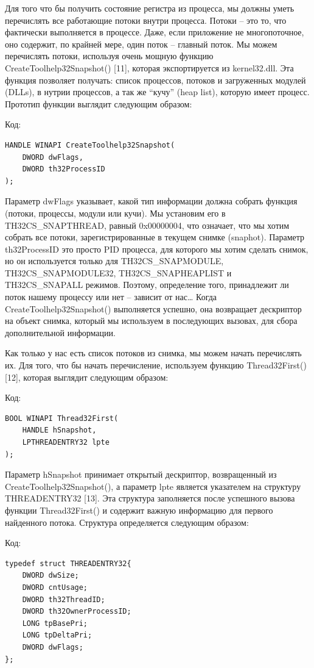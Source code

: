 \documentclass[12pt, a4paper, oneside]{book}
\begin{document}
Для того что бы получить состояние регистра из процесса, мы должны уметь перечислять все работающие потоки внутри процесса. Потоки – это то, что фактически выполняется в процессе. Даже, если приложение не многопоточное, оно содержит, по крайней мере, один поток – главный поток. Мы можем перечислять потоки, используя очень мощную функцию CreateToolhelp32Snapshot() [11], которая экспортируется из kernel32.dll. Эта функция позволяет получать: список процессов, потоков и загруженных модулей (DLLs), в нутрии процессов, а так же “кучу” (heap list), которую имеет процесс. Прототип функции выглядит следующим образом:

Код:
\begin{verbatim}
HANDLE WINAPI CreateToolhelp32Snapshot(
    DWORD dwFlags,
    DWORD th32ProcessID
);
\end{verbatim}

Параметр dwFlags указывает, какой тип информации должна собрать функция (потоки, процессы, модули или кучи). Мы установим его в TH32CS\_SNAPTHREAD, равный 0x00000004, что означает, что мы хотим собрать все потоки, зарегистрированные в текущем снимке (snaphot). Параметр th32ProcessID это просто PID процесса, для которого мы хотим сделать снимок, но он используется только для TH32CS\_SNAPMODULE, TH32CS\_SNAPMODULE32, TH32CS\_SNAPHEAPLIST и TH32CS\_SNAPALL режимов. Поэтому, определение того, принадлежит ли поток нашему процессу или нет – зависит от нас… Когда CreateToolhelp32Snapshot() выполняется успешно, она возвращает дескриптор на объект снимка, который мы используем в последующих вызовах, для сбора дополнительной информации.

Как только у нас есть список потоков из снимка, мы можем начать перечислять их. Для того, что бы начать перечисление, используем функцию Thread32First() [12], которая выглядит следующим образом:

Код:
\begin{verbatim}
BOOL WINAPI Thread32First(
    HANDLE hSnapshot,
    LPTHREADENTRY32 lpte
);
\end{verbatim}

Параметр hSnapshot принимает открытый дескриптор, возвращенный из CreateToolhelp32Snapshot(), а параметр lpte является указателем на структуру THREADENTRY32 [13]. Эта структура заполняется после успешного вызова функции Thread32First() и содержит важную информацию для первого найденного потока. Структура определяется следующим образом:

Код:
\begin{verbatim}
typedef struct THREADENTRY32{
    DWORD dwSize;
    DWORD cntUsage;
    DWORD th32ThreadID;
    DWORD th32OwnerProcessID;
    LONG tpBasePri;
    LONG tpDeltaPri;
    DWORD dwFlags;
};
\end{verbatim}
\end{document}
